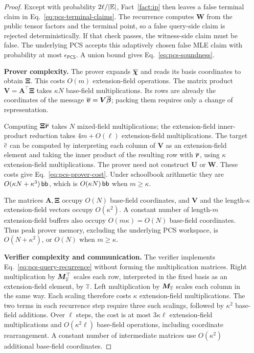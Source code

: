 \begin{proof}
Except with probability \(2\ell/|\mathbb{E}|\),
Fact~\ref{fact:ip} then leaves a false terminal claim in
Eq.~\eqref{eq:pcs-terminal-claims}.
The recurrence computes \(\bm W\) from the public tensor factors
and the terminal point, so a false query-side claim is rejected
deterministically. If that check passes, the witness-side claim
must be false. The underlying PCS accepts this adaptively chosen
false MLE claim with probability at most
\(\epsilon_{\mathsf{PCS}}\).
A union bound gives Eq.~\eqref{eq:pcs-soundness}.

\smallskip\noindent\textbf{Prover complexity.}
The prover expands \(\overline{\bm\chi}\) and reads its basis
coordinates to obtain \(\bm\Xi\).
This costs \(O(m)\) extension-field operations.
The matrix product \(\bm V=\bm A^\top\bm\Xi\) takes
\(\kappa N\) base-field multiplications. Its rows are already
the coordinates of the message
\(\overline{\bm v}=\bm V\overline{\bm\beta}\); packing them requires
only a change of representation.

Computing \(\bm\Xi\overline{\bm r}\) takes \(N\) mixed-field
multiplications; the extension-field inner-product reduction takes
\(4m+O(\ell)\) extension-field multiplications.
The target \(\overline{c}\) can be computed by interpreting each column
of \(\bm V\) as an extension-field element and taking the inner
product of the resulting row with \(\overline{\bm r}\), using
\(\kappa\) extension-field multiplications.
The prover need not construct \(\bm U\) or \(\bm W\).
These costs give Eq.~\eqref{eq:pcs-prover-cost}.
Under schoolbook arithmetic they are
\(O(\kappa N+\kappa^3)\,\mathsf{bb}\), which is
\(O(\kappa N)\,\mathsf{bb}\) when \(m\geq\kappa\).

The matrices \(\bm A,\bm\Xi\) occupy \(O(N)\) base-field
coordinates, and \(\bm V\) and the length-\(\kappa\)
extension-field vectors occupy \(O(\kappa^2)\).
A constant number of length-\(m\) extension-field buffers also
occupy \(O(m\kappa)=O(N)\) base-field coordinates.
Thus peak prover memory, excluding the underlying PCS workspace,
is \(O(N+\kappa^2)\), or \(O(N)\) when \(m\geq\kappa\).

\smallskip\noindent\textbf{Verifier complexity and communication.}
The verifier implements Eq.~\eqref{eq:pcs-query-recurrence}
without forming the multiplication matrices.
Right multiplication by \(\bm M_{\overline{z}}^\top\) scales each
row, interpreted in the fixed basis as an extension-field element,
by \(\overline{z}\). Left multiplication by \(\bm M_{\overline{z}}\)
scales each column in the same way. Each scaling therefore costs
\(\kappa\) extension-field multiplications.
The two terms in each recurrence step require three such scalings,
followed by \(\kappa^2\) base-field additions.
Over \(\ell\) steps, the cost is at most
\(3\kappa\ell\) extension-field multiplications and
\(O(\kappa^2\ell)\) base-field operations, including coordinate
rearrangement. A constant number of intermediate matrices use
\(O(\kappa^2)\) additional base-field coordinates.


\end{proof}
